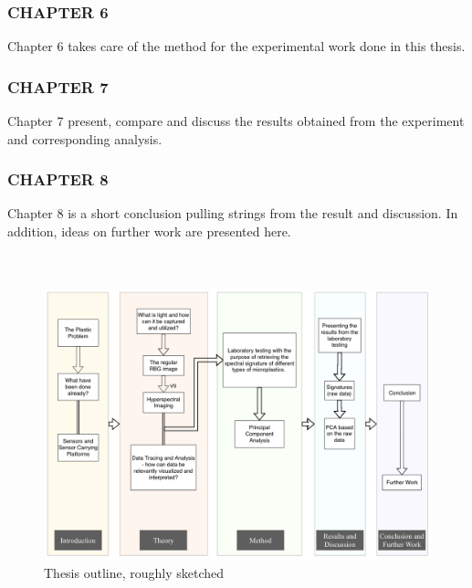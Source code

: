 \subsubsection*{CHAPTER 6} Chapter 6 takes care of the method for the experimental work done in this thesis.
\subsubsection*{CHAPTER 7} Chapter 7 present, compare and discuss the results obtained from the experiment and corresponding analysis.
\subsubsection*{CHAPTER 8} Chapter 8 is a short conclusion pulling strings from the result and discussion. In addition, ideas on further work are presented here.
\\\\\\
\begin{figure}[H]
  \includegraphics[width=\linewidth]{Images/thesisoutline.png}
  \caption[Thesis Outline]{Thesis outline, roughly sketched}
  \label{fig:outline}
\end{figure}


